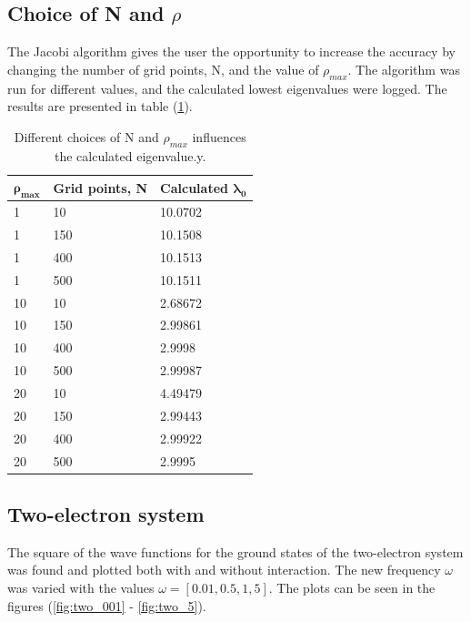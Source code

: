 \documentclass[10pt,a4paper,titlepage]{article}
\begin{document}
\subsection{Choice of N and $\rho$}
The Jacobi algorithm gives the user the opportunity to increase the accuracy by changing the number of grid points, N, and the value of $\rho_{max}$. The algorithm was run for different values, and the calculated lowest eigenvalues were logged. The results are presented in table (\ref{tab:N_Rho_Lambda}).
\begin{table}[!h]
\centering
\caption{Different choices of N and $\rho_{max}$ influences the calculated eigenvalue.y.}
\label{tab:N_Rho_Lambda}
\begin{tabular}{|l|l|l|}
\hline
$\mathbf{\rho_{max}}$    &\bf Grid points, N &\bf Calculated $\mathbf{\lambda_0}$\\ \hline
1   & 10       & 10.0702\\ \hline
1  & 150        &  10.1508\\ \hline
1 & 400       &  10.1513\\ \hline
1 & 500      &  10.1511\\ \hline
10   & 10       & 2.68672\\ \hline
10  & 150        &  2.99861\\ \hline
10 & 400       &  2.9998\\ \hline
10 & 500      &  2.99987\\ \hline
20   & 10       & 4.49479\\ \hline
20  & 150        &  2.99443 \\ \hline
20 & 400       &  2.99922 \\ \hline
20 & 500      &  2.9995\\ \hline
\end{tabular}
\end{table}





\subsection{Two-electron system}
The square of the wave functions for the ground states of the two-electron system was found and plotted both with and without interaction. The new frequency $\omega$ was varied with the values $\omega = [0.01, 0.5, 1, 5]$. The plots can be seen in the figures (\ref{fig:two_001} - \ref{fig:two_5}). 
\end{document}

